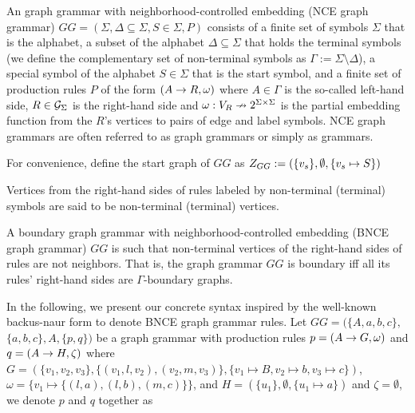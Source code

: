 \documentclass[]{report}
\begin{document}

\begin{definition}
	\label{def:gg}
	An graph grammar with neighborhood-controlled embedding (NCE graph grammar) $GG = (\Sigma, \Delta \subseteq \Sigma, S \in \Sigma, P)$ consists of a finite set of symbols $\Sigma$ that is the alphabet, a subset of the alphabet $\Delta \subseteq \Sigma$ that holds the terminal symbols (we define the complementary set of non-terminal symbols as $\Gamma := \Sigma \setminus \Delta$), a special symbol of the alphabet $S \in \Sigma$ that is the start symbol, and a finite set of production rules $P$ of the form $(A \to R, \omega)$ where $A \in \Gamma$ is the so-called left-hand side, $R \in \mathcal{G}_{\Sigma}$ is the right-hand side and $\omega : V_R \nrightarrow 2^{\Sigma \times \Sigma}$ is the partial embedding function from the $R$'s vertices to pairs of edge and label symbols. NCE graph grammars are often referred to as graph grammars or simply as grammars.
	
	For convenience, define the start graph of $GG$ as $Z_{GG} := (\{v_s\},\emptyset,\{v_s \mapsto S\})$
	
	Vertices from the right-hand sides of rules labeled by non-terminal (terminal) symbols are said to be non-terminal (terminal) vertices.
\end{definition}

\begin{definition}
	A boundary graph grammar with neighborhood-controlled embedding (BNCE graph grammar) $GG$ is such that non-terminal vertices of the right-hand sides of rules are not neighbors. That is, the graph grammar $GG$ is boundary iff all its rules' right-hand sides are $\Gamma\text{-boundary}$ graphs.
\end{definition}


In the following, we present our concrete syntax inspired by the well-known backus-naur form to denote BNCE graph grammar rules. Let $GG = (\{A,a,b,c\},$ $\{a,b,c\}, A, \{p,q\})$ be a graph grammar with production rules $p = (A \to G,\omega)$ and $q = (A \to H,\zeta)$ where $G = (\{v_1, v_2, v_3\}, \{(v_1,l,v_2), (v_2,m,v_3)\}, \{v_1 \mapsto B, v_2 \mapsto b, v_3 \mapsto c \})$, $\omega = \{v_1 \mapsto \{(l,a), (l,b), (m,c)\}\}$, and $H = (\{u_1\}, \emptyset, \{u_1 \mapsto a\})$ and $\zeta = \emptyset$, we denote $p$ and $q$ together as\\
\end{document}
